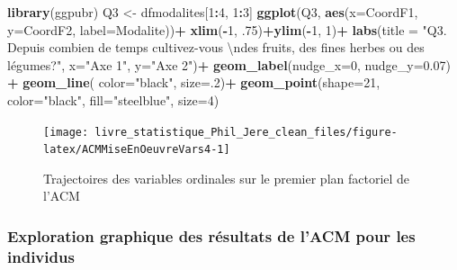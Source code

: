 \documentclass[
  11pt,
  french,
]{book}
\makeatletter
\newenvironment{Shaded}{\begin{snugshade}}{\end{snugshade}}
\newcommand{\CharTok}[1]{\textcolor[rgb]{0.31,0.60,0.02}{#1}}
\newcommand{\DataTypeTok}[1]{\textcolor[rgb]{0.13,0.29,0.53}{#1}}
\newcommand{\DecValTok}[1]{\textcolor[rgb]{0.00,0.00,0.81}{#1}}
\newcommand{\FloatTok}[1]{\textcolor[rgb]{0.00,0.00,0.81}{#1}}
\newcommand{\KeywordTok}[1]{\textcolor[rgb]{0.13,0.29,0.53}{\textbf{#1}}}
\newcommand{\NormalTok}[1]{#1}
\newcommand{\OperatorTok}[1]{\textcolor[rgb]{0.81,0.36,0.00}{\textbf{#1}}}
\newcommand{\StringTok}[1]{\textcolor[rgb]{0.31,0.60,0.02}{#1}}
\newenvironment{kframe}{%
\medskip{}
\setlength{\fboxsep}{.8em}
 \def\at@end@of@kframe{}%
 \ifinner\ifhmode%
  \def\at@end@of@kframe{\end{minipage}}%
  \begin{minipage}{\columnwidth}%
 \fi\fi%
 \def\FrameCommand##1{\hskip\@totalleftmargin \hskip-\fboxsep
 \colorbox{shadecolor}{##1}\hskip-\fboxsep
     \hskip-\linewidth \hskip-\@totalleftmargin \hskip\columnwidth}%
 \MakeFramed {\advance\hsize-\width
   \@totalleftmargin\z@ \linewidth\hsize
   \@setminipage}}%
 {\par\unskip\endMakeFramed%
 \at@end@of@kframe}
\renewenvironment{Shaded}{\begin{kframe}}{\end{kframe}}
\makeatother
\begin{document}
\begin{Shaded}
\begin{Highlighting}[]
\KeywordTok{library}\NormalTok{(ggpubr)}
\NormalTok{Q3 <-}\StringTok{ }\NormalTok{dfmodalites[}\DecValTok{1}\OperatorTok{:}\DecValTok{4}\NormalTok{, }\DecValTok{1}\OperatorTok{:}\DecValTok{3}\NormalTok{]}
\KeywordTok{ggplot}\NormalTok{(Q3, }\KeywordTok{aes}\NormalTok{(}\DataTypeTok{x=}\NormalTok{CoordF1, }\DataTypeTok{y=}\NormalTok{CoordF2, }\DataTypeTok{label=}\NormalTok{Modalite))}\OperatorTok{+}
\StringTok{  }\KeywordTok{xlim}\NormalTok{(}\OperatorTok{-}\DecValTok{1}\NormalTok{, }\FloatTok{.75}\NormalTok{)}\OperatorTok{+}\KeywordTok{ylim}\NormalTok{(}\OperatorTok{-}\DecValTok{1}\NormalTok{, }\DecValTok{1}\NormalTok{)}\OperatorTok{+}
\StringTok{  }\KeywordTok{labs}\NormalTok{(}\DataTypeTok{title =} \StringTok{"Q3. Depuis combien de temps cultivez-vous }\CharTok{\textbackslash{}n}\StringTok{des fruits, des fines herbes ou des légumes?"}\NormalTok{,}
       \DataTypeTok{x=}\StringTok{"Axe 1"}\NormalTok{, }\DataTypeTok{y=}\StringTok{"Axe 2"}\NormalTok{)}\OperatorTok{+}
\StringTok{  }\KeywordTok{geom_label}\NormalTok{(}\DataTypeTok{nudge_x=}\DecValTok{0}\NormalTok{, }\DataTypeTok{nudge_y=}\FloatTok{0.07}\NormalTok{) }\OperatorTok{+}
\StringTok{  }\KeywordTok{geom_line}\NormalTok{( }\DataTypeTok{color=}\StringTok{"black"}\NormalTok{, }\DataTypeTok{size=}\NormalTok{.}\DecValTok{2}\NormalTok{)}\OperatorTok{+}
\StringTok{  }\KeywordTok{geom_point}\NormalTok{(}\DataTypeTok{shape=}\DecValTok{21}\NormalTok{, }\DataTypeTok{color=}\StringTok{"black"}\NormalTok{, }\DataTypeTok{fill=}\StringTok{"steelblue"}\NormalTok{, }\DataTypeTok{size=}\DecValTok{4}\NormalTok{)}
\end{Highlighting}
\end{Shaded}

\begin{figure}

{\centering \texttt{[image: livre\_statistique\_Phil\_Jere\_clean\_files/figure-latex/ACMMiseEnOeuvreVars4-1]} 

}

\caption{Trajectoires des variables ordinales sur le premier plan factoriel de l'ACM }\label{fig:ACMMiseEnOeuvreVars4}
\end{figure}

\hypertarget{sect124214}{%
\subsubsection{Exploration graphique des résultats de l'ACM pour les individus}\label{sect124214}}
\end{document}
